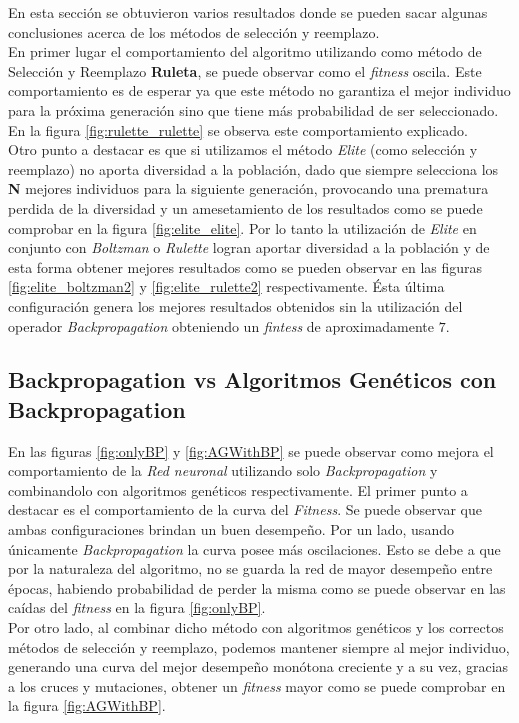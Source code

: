 \documentclass{sig-alternate}
\begin{document}
		En esta sección se obtuvieron varios resultados donde se pueden sacar algunas conclusiones acerca de los métodos de selección y reemplazo.\\
		En primer lugar el comportamiento del algoritmo utilizando como método de Selección y Reemplazo \textbf{Ruleta}, se puede observar como el \textit{fitness} oscila. Este comportamiento es de esperar ya que este método no garantiza el mejor individuo para la próxima generación sino que tiene más probabilidad de ser seleccionado. En la figura \ref{fig:rulette_rulette} se observa este comportamiento explicado.\\
		Otro punto a destacar es que si utilizamos el método \textit{Elite} (como selección y reemplazo) no aporta diversidad a la población, dado que siempre selecciona los \textbf{N} mejores individuos para la siguiente generación, provocando una prematura perdida de la diversidad y un amesetamiento de los resultados como se puede comprobar en la figura \ref{fig:elite_elite}. Por lo tanto la utilización de \textit{Elite} en conjunto con \textit{Boltzman} o \textit{Rulette} logran aportar diversidad a la población y de esta forma obtener mejores resultados como se pueden observar en las figuras \ref{fig:elite_boltzman2} y \ref{fig:elite_rulette2} respectivamente. Ésta última configuración genera los mejores resultados obtenidos sin la utilización del operador \textit{Backpropagation} obteniendo un \textit{fintess} de aproximadamente $7$.

		\subsection{Backpropagation vs Algoritmos Genéticos con Backpropagation}

		En las figuras \ref{fig:onlyBP} y \ref{fig:AGWithBP} se puede observar como mejora el comportamiento de la \textit{Red neuronal} utilizando solo \textit{Backpropagation} y combinandolo con algoritmos genéticos  respectivamente.
		El primer punto a destacar es el comportamiento de la curva del \textit{Fitness}.
		Se puede observar que ambas configuraciones brindan un buen desempeño. Por un lado, usando únicamente \textit{Backpropagation} la curva posee más oscilaciones. Esto se debe a que por la naturaleza del algoritmo, no se guarda la red de mayor desempeño entre épocas, habiendo probabilidad de perder la misma como se puede observar en las caídas del \textit{fitness} en la figura  \ref{fig:onlyBP}.\\
		Por otro lado, al combinar dicho método con algoritmos genéticos y los correctos métodos de selección y reemplazo, podemos mantener siempre al mejor individuo, generando una curva del mejor desempeño monótona creciente y a su vez, gracias a los cruces y mutaciones, obtener un \textit{fitness} mayor como se puede comprobar en la figura   \ref{fig:AGWithBP}.
		
\end{document}
